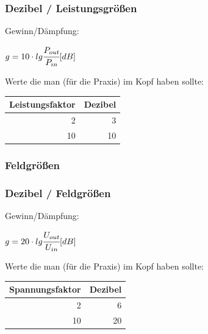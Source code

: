 \begin{frame}
  \frametitle{Dezibel / Leistungsgrößen}

  Gewinn/Dämpfung:

  \begin{center}
    $g = 10 \cdot lg \cfrac{P_{out}}{P_{in}} [dB]$
  \end{center}

  \vspace{2em}

  Werte die man (für die Praxis) im Kopf haben sollte:

  \begin{center}
    \footnotesize
    \begin{tabular}{|r|r|}\hline
      \textbf{Leistungsfaktor} & \textbf{Dezibel} \\ \hline \hline
      2                       &  3               \\ \hline
      10                       & 10               \\ \hline
    \end{tabular}
  \end{center}

\end{frame}

\subsubsection{Feldgrößen}

\begin{frame}
  \frametitle{Dezibel / Feldgrößen}


  Gewinn/Dämpfung:

  \begin{center}
    $g = 20 \cdot lg \cfrac{U_{out}}{U_{in}} [dB]$
  \end{center}

  \vspace{2em}

  Werte die man (für die Praxis) im Kopf haben sollte:

  \begin{center}
    \footnotesize
    \begin{tabular}{|r|r|}\hline
      \textbf{Spannungsfaktor} & \textbf{Dezibel} \\ \hline \hline
      2                       &  6               \\ \hline
      10                       & 20               \\ \hline
    \end{tabular}
  \end{center}

\end{frame}

